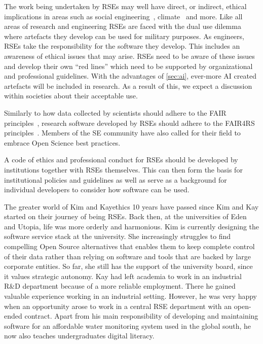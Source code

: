 \documentclass{eceasst}
\begin{document}
The work being undertaken by RSEs may well have direct, or indirect,
ethical implications in areas such as social engineering~\cite{s2erc,Siadati2024},
climate~\cite{Lannelongue2023} and more.
Like all areas of research and engineering RSEs are faced with the dual use dilemma~\cite{Bobier2024} where artefacts they develop can be used for military purposes.
As engineers, RSEs take the responsibility for the software they develop.
This includes an awareness of ethical issues that may arise.
RSEs need to be aware of these issues and develop their own ``red lines''
which need to be supported by organizational and professional guidelines.
With the advantages of \autoref{sec:ai}, ever-more AI created artefacts will be included in research.
As a result of this, we expect a discussion within societies about their acceptable use.

Similarly to how data collected by scientists should adhere to the FAIR principles~\cite{FAIR},
research software developed by RSEs should adhere to the FAIR4RS principles~\cite{FAIR4RS}.
Members of the SE community have also called for their field to embrace Open Science best practices\cite{OliveiraJr2024,Druskat2025}.

A code of ethics and professional conduct for RSEs should be developed by institutions together with RSEs themselves.
This can then form the basis for institutional policies and guidelines as well as serve as a background for individual developers to consider how software can be used.

\begin{story}{The greater world of Kim and Kay}{ethics}
10 years have passed since Kim and Kay started on their journey of being RSEs. Back then,
at the universities of Eden and Utopia, life was more orderly and harmonious.
Kim is currently designing the software service stack at the university.
She increasingly struggles to find compelling Open Source alternatives that enables them to keep complete control of their data
rather than relying on software and tools that are backed by large corporate entities.
So far, she still has the support of the university board, since it values strategic autonomy.
Kay had left academia to work in an industrial R\&D department because of a more reliable employment.
There he gained valuable experience working in an industrial setting.
However, he was very happy when an opportunity arose to work in a central
RSE department with an open-ended contract. Apart from his main responsibility
of developing and maintaining software for an affordable water monitoring system
used in the global south, he now also teaches undergraduates digital literacy.
\end{story}
\end{document}
